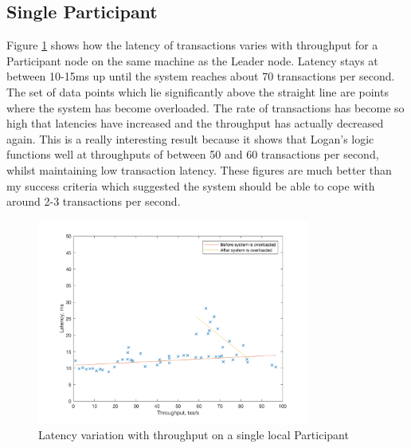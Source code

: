 \documentclass[12pt,a4paper,twoside,openright]{report}
\begin{document}
	\subsection{Single Participant}
	Figure \ref{fig:singlocal} shows how the latency of transactions varies with throughput for a Participant node on the same machine as the Leader node.
	Latency stays at between 10-15ms up until the system reaches about 70 transactions per second.
	The set of data points which lie significantly above the straight line are points where the system has become overloaded. 
	The rate of transactions has become so high that latencies have increased and the throughput has actually decreased again. 
	This is a really interesting result because it shows that Logan's logic functions well at throughputs of between 50 and 60 transactions per second, whilst maintaining low transaction latency.
	These figures are much better than my success criteria which suggested the system should be able to cope with around 2-3 transactions per second.\\
	\begin{figure}
		\centering
		\includegraphics[width=0.8\textwidth]{figs/single_local_worker.png}
		\caption{Latency variation with throughput on a single local Participant}
		\label{fig:singlocal}
	\end{figure}
\end{document}
